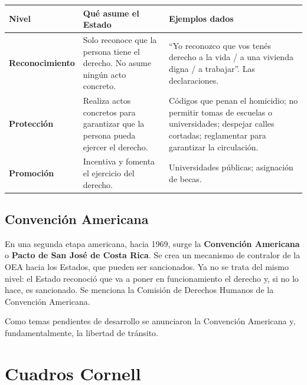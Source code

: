 \documentclass[12pt,oneside]{book}
\begin{document}
\begin{table}[H]
\centering
\small
\begin{tabularx}{\textwidth}{
    >{\raggedright\arraybackslash}p{}
    >{\raggedright\arraybackslash}X
    >{\raggedright\arraybackslash}X
}
\toprule
\textbf{Nivel} &
\textbf{Qué asume el Estado} &
\textbf{Ejemplos dados} \\
\midrule

\textbf{Reconocimiento} &
Solo reconoce que la persona tiene el derecho. No asume ningún acto concreto. &
``Yo reconozco que vos tenés derecho a la vida / a una vivienda digna / a trabajar''. Las declaraciones. \\

\textbf{Protección} &
Realiza actos concretos para garantizar que la persona pueda ejercer el derecho. &
Códigos que penan el homicidio; no permitir tomas de escuelas o universidades; despejar calles cortadas; reglamentar para garantizar la circulación. \\

\textbf{Promoción} &
Incentiva y fomenta el ejercicio del derecho. &
Universidades públicas; asignación de becas. \\

\bottomrule
\end{tabularx}
\end{table}

\section{Convención Americana}

En una segunda etapa americana, hacia 1969, surge la \textbf{Convención Americana} o \textbf{Pacto de San José de Costa Rica}. Se crea un mecanismo de contralor de la OEA hacia los Estados, que pueden ser sancionados. Ya no se trata del mismo nivel: el Estado reconoció que va a poner en funcionamiento el derecho y, si no lo hace, es sancionado. Se menciona la Comisión de Derechos Humanos de la Convención Americana.

Como temas pendientes de desarrollo se anunciaron la Convención Americana y, fundamentalmente, la libertad de tránsito.

\chapter[Cuadros Cornell]{Cuadros Cornell}
\end{document}
